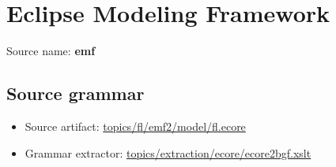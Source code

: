 \chapter{Eclipse Modeling Framework}

 Source name: \textbf{emf}

\section{Source grammar}

\begin{itemize}\item Source artifact: \href{http://github.com/grammarware/slps/blob/master/topics/fl/emf2/model/fl.ecore}{topics/fl/emf2/model/fl.ecore}\item Grammar extractor: \href{http://github.com/grammarware/slps/blob/master/topics/extraction/ecore/ecore2bgf.xslt}{topics/extraction/ecore/ecore2bgf.xslt}\end{itemize}

